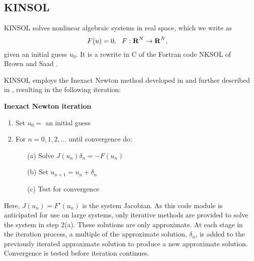 \subsection{KINSOL}\label{ss:kinsol}

KINSOL solves nonlinear algebraic systems in real space, which we write as
\begin{equation}
F(u) = 0,~~ F:\mbox{\bf R}^N \rightarrow \mbox{\bf R}^N, 
\label{nonlinear_system}
\end{equation}
given an initial guess $u_0$.  It is a rewrite in C of the Fortran
code NKSOL of Brown and Saad \cite{BrSa:90}.

KINSOL employs the Inexact Newton method developed in 
\cite{BrSa:90,Bro:87,DES:82} 
and further described in \cite{DeSc:96,Kel:95}, 
resulting in the following iteration:

\vspace{0.2in}
{\bf Inexact Newton iteration}
\begin{enumerate}
   \item Set $u_0 = $ an initial guess
   \item For $n = 0, 1, 2,...$ until convergence do:\nonumber 
      \begin{itemize}
          \item[(a)] Solve $J(u_n)\delta_n = - F(u_n)$ 
          \item[(b)] Set $u_{n+1} = u_n + \delta_n$
          \item[(c)] Test for convergence
      \end{itemize}
\end{enumerate}
Here, $J(u_n) = F'(u_n)$ is the system Jacobian. As this code module is
anticipated for use on large systems, only iterative methods are provided 
to solve the system in step 2(a). These solutions are only approximate. 
At each stage in the iteration process, a multiple of the 
approximate solution, $\delta_n$, is added 
to the previously iterated approximate solution to produce a new 
approximate solution. Convergence is tested before iteration continues. 

